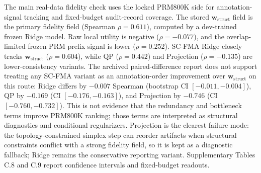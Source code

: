 \documentclass[a4paper,fleqn]{cas-sc}
\newcommand{\wstruct}{\ensuremath{\mathbf{w}_{\mathrm{struct}}}}
\begin{document}
The main real-data fidelity check uses the locked PRM800K side for annotation-signal tracking and fixed-budget audit-record coverage. The stored \wstruct{} field is the primary fidelity field (Spearman $\rho = 0.611$), computed by a dev-trained frozen Ridge model. Raw local utility is negative ($\rho = -0.077$), and the overlap-limited frozen PRM prefix signal is lower ($\rho = 0.252$). SC-FMA Ridge closely tracks \wstruct{} ($\rho = 0.604$), while QP ($\rho = 0.442$) and Projection ($\rho = -0.135$) are lower-consistency variants. The archived paired-difference report does not support treating any SC-FMA variant as an annotation-order improvement over \wstruct{} on this route: Ridge differs by $-0.007$ Spearman (bootstrap CI $[-0.011,-0.004]$), QP by $-0.169$ (CI $[-0.176,-0.163]$), and Projection by $-0.746$ (CI $[-0.760,-0.732]$). This is not evidence that the redundancy and bottleneck terms improve PRM800K ranking; those terms are interpreted as structural diagnostics and conditional regularizers. Projection is the clearest failure mode: the topology-constrained simplex step can reorder artifacts when structural constraints conflict with a strong fidelity field, so it is kept as a diagnostic fallback; Ridge remains the conservative reporting variant. Supplementary Tables C.8 and C.9 report confidence intervals and fixed-budget readouts.
\end{document}

